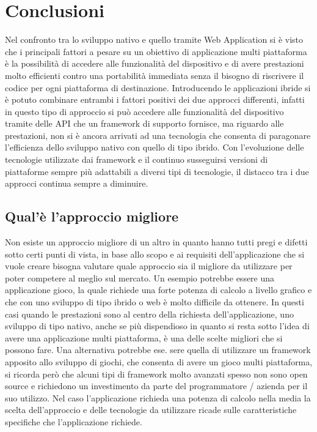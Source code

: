 \section{Conclusioni}

Nel confronto tra lo sviluppo nativo e quello tramite Web Application si è visto che i principali fattori a pesare su un obiettivo di applicazione multi piattaforma è la possibilità di accedere alle funzionalità del dispositivo e di avere prestazioni molto efficienti contro una portabilità immediata senza il bisogno di riscrivere il codice per ogni piattaforma di destinazione. 
Introducendo le applicazioni ibride si è potuto combinare entrambi i fattori positivi dei due approcci differenti, infatti in questo tipo di approccio si può accedere alle funzionalità del dispositivo tramite delle API che un framework di supporto fornisce, ma riguardo alle prestazioni, non si è ancora arrivati ad una tecnologia che consenta di paragonare l'efficienza dello sviluppo nativo con quello di tipo ibrido. Con l'evoluzione delle tecnologie utilizzate dai framework e il continuo susseguirsi versioni di piattaforme sempre più adattabili a diversi tipi di tecnologie, il distacco tra i due approcci continua sempre a diminuire.

\subsection{Qual'è l'approccio migliore}

Non esiste un approccio migliore di un altro in quanto hanno tutti pregi e difetti sotto certi punti di vista, in base allo scopo e ai requisiti dell'applicazione che si vuole creare bisogna valutare quale approccio sia il migliore da utilizzare per poter competere al meglio sul mercato.
Un esempio potrebbe essere una applicazione gioco, la quale richiede una forte potenza di calcolo a livello grafico e che con uno sviluppo di tipo ibrido o web è molto difficile da ottenere. In questi casi quando le prestazioni sono al centro della richiesta dell'applicazione, uno sviluppo di tipo nativo, anche se più dispendioso in quanto si resta sotto l'idea di avere una applicazione multi piattaforma, è una delle scelte migliori che si possono fare.
Una alternativa potrebbe ese.
sere quella di utilizzare un framework apposito allo sviluppo di giochi, che consenta di avere un gioco multi piattaforma, si ricorda però che alcuni tipi di framework molto avanzati spesso non sono open source e richiedono un investimento da parte del programmatore / azienda per il suo utilizzo.
Nel caso l'applicazione richieda una potenza di calcolo nella media la scelta dell'approccio e delle tecnologie da utilizzare ricade sulle caratteristiche specifiche che l'applicazione richiede.


